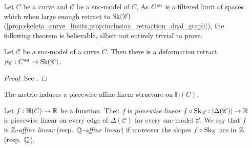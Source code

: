 Let $C$ be a curve and $\mathscr C$ be a snc-model of $C$. 
As $C{}^{\text{an}}$ is a filtered limit of spaces which when large enough retract to $\operatorname{Sk}(\mathscr C)$ (\cref{prop:skeleta_curve_limits,prop:inclusion_retraction_dual_graph}), the following theorem is believable, albeit not entirely trivial to prove. 
\begin{proposition}\label{prop:retract_analytification_skeleton}
	Let $\mathscr C$ be a snc-model of a curve $C$. 
	Then there is a deformation retract $\rho_{\mathscr C}: C{}^{\text{an}} \to \operatorname{Sk}(\mathscr C)$. 
\end{proposition}
\begin{proof}
	See \cite[§2.2.2]{bakerWeightFunctionsBerkovich2016}.
\end{proof}

The metric induces a piecewise affine linear structure on $\mathbb{H}(C)$. 
\begin{definition}
	Let $f: \mathbb{H}(C) \to \mathbb{R}$ be a function. 
	Then $f$ is \emph{piecewise linear} $f \circ \operatorname{Sk}_{\mathscr C}: |\Delta(\mathscr C)| \to \mathbb{R}$ is piecewise linear on every edge of $ \Delta(\mathscr C)$ for every snc-model $\mathscr C$. 
	We say that $f$ is \emph{$\mathbb{Z}$-affine linear} (resp.\ \emph{$\mathbb{Q}$-affine linear}) if moreover the slopes $f \circ \operatorname{Sk} _{\mathscr C}$ are in $\mathbb{Z} $ (resp.\ $\mathbb{Q}$).
\end{definition}




